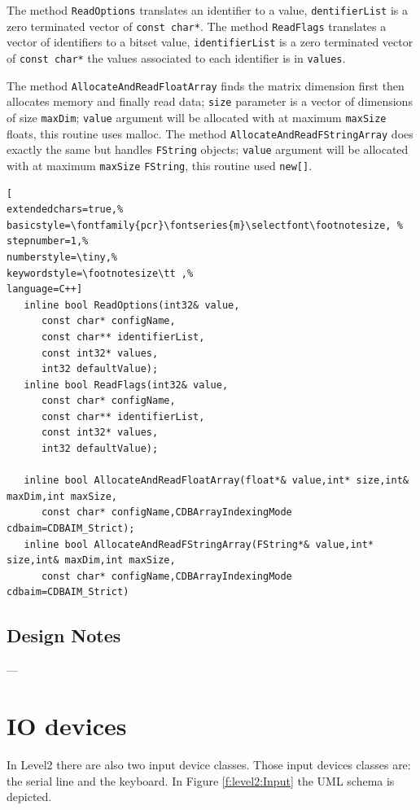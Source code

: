The method \texttt{ReadOptions} translates an identifier to a value, \texttt{dentifierList} is a zero terminated vector of \texttt{const char*}.
The method \texttt{ReadFlags} translates a vector of identifiers to a bitset value, \texttt{identifierList} is a zero terminated vector of \texttt{const char*} the values associated to each identifier is in \texttt{values}.

The method \texttt{AllocateAndReadFloatArray} finds the matrix dimension first then allocates memory and finally read data; \texttt{size} parameter is a vector of dimensions of size \texttt{maxDim}; \texttt{value} argument will be allocated with at maximum \texttt{maxSize} floats, this routine uses malloc. The method \texttt{AllocateAndReadFStringArray} does exactly the same but handles \texttt{FString} objects; \texttt{value} argument will be allocated with at maximum \texttt{maxSize} \texttt{FString}, this routine used \texttt{new[]}.
\begin{lstlisting}[
extendedchars=true,%
basicstyle=\fontfamily{pcr}\fontseries{m}\selectfont\footnotesize, %
stepnumber=1,%
numberstyle=\tiny,%
keywordstyle=\footnotesize\tt ,%
language=C++]
   inline bool ReadOptions(int32& value,
      const char* configName,
      const char** identifierList,
      const int32* values,
      int32 defaultValue);
   inline bool ReadFlags(int32& value,
      const char* configName,
      const char** identifierList,
      const int32* values,
      int32 defaultValue);

   inline bool AllocateAndReadFloatArray(float*& value,int* size,int& maxDim,int maxSize,
      const char* configName,CDBArrayIndexingMode cdbaim=CDBAIM_Strict);
   inline bool AllocateAndReadFStringArray(FString*& value,int* size,int& maxDim,int maxSize,
      const char* configName,CDBArrayIndexingMode cdbaim=CDBAIM_Strict)
\end{lstlisting}



\subsection{Design Notes}
---



\section{IO devices}
In Level2 there are also two input device classes. Those input devices classes are: the serial line and the keyboard. In Figure \ref{f:level2:Input} the UML schema is depicted.


